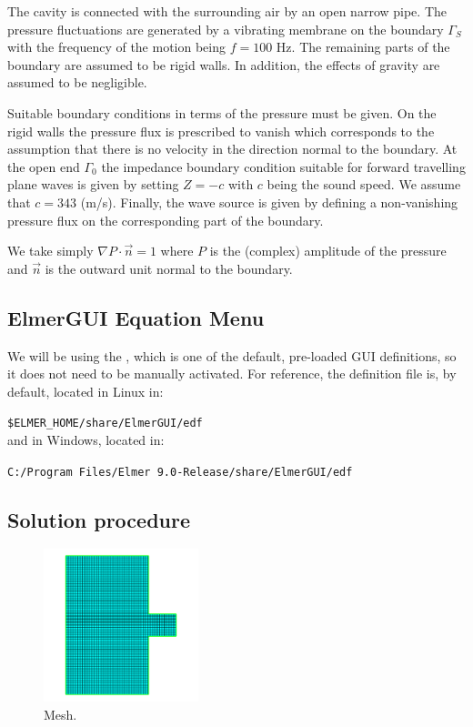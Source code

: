 The cavity is connected with the surrounding air by an open narrow pipe. The pressure fluctuations are generated by a vibrating membrane on the boundary $\Gamma_S$ with the frequency of the motion being $f=100$ Hz.  The remaining parts of the boundary are assumed to be rigid walls. In addition, the effects of gravity are assumed to be negligible.

Suitable boundary conditions in terms of the pressure must be given. On the rigid walls the pressure flux is prescribed to vanish which corresponds to the assumption that there is no velocity in the direction normal to the boundary. At the open end $\Gamma_0$ the impedance boundary condition suitable for forward travelling plane waves is given by setting $Z=-c$ with $c$ being the sound speed. We assume that $c=343$ (m/s). Finally, the wave source is given by defining a non-vanishing pressure flux on the corresponding part of the boundary.

We take simply $\nabla P \cdot \vec n = 1$ where $P$ is the (complex) amplitude of the pressure and $\vec n$ is the outward unit normal to the boundary.


\subsection*{ElmerGUI Equation Menu}

We will be using the , which is one of the default, pre-loaded GUI definitions, so it does not need to be manually activated.  For reference, the  \texttt{} definition file is, by default, located in Linux in:

\texttt{\$ELMER\_HOME/share/ElmerGUI/edf}\\

and in Windows, located in:

\texttt{C:/Program Files/Elmer 9.0-Release/share/ElmerGUI/edf}\\

\subsection*{Solution procedure}

\begin{figure}
\centering
\includegraphics[width=0.4\textwidth]{mesh}
\caption{Mesh.}\label{fg:mesh}
\end{figure}

